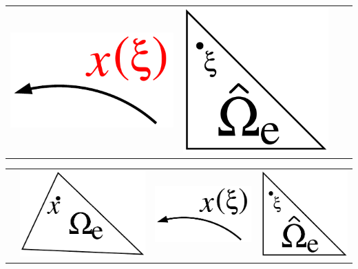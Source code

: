 \begin{frame}[t]
{\begin{tabular}{p{}ccc}
      \includegraphics[width=.2\textwidth]{figures/map_red}&
      \includegraphics[width=.15\textwidth]{figures/reference_element}
    \end{tabular}
    }
    {
    \begin{tabular}{p{}ccc} \\ 
      &
      \includegraphics[width=.2\textwidth]{figures/physical_element}&
      \includegraphics[width=.2\textwidth]{figures/map}&
      \includegraphics[width=.15\textwidth]{figures/reference_element}
    \end{tabular}
    }
    



\end{frame}
